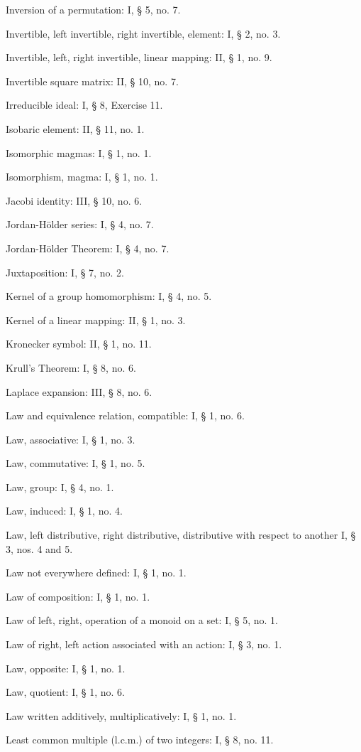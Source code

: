 Inversion of a permutation: I, § 5, no. 7.

Invertible, left invertible, right invertible, element: I, § 2, no. 3.

Invertible, left, right invertible, linear mapping: II, § 1, no. 9.

Invertible square matrix: II, § 10, no. 7.

Irreducible ideal: I, § 8, Exercise 11.

Isobaric element: II, § 11, no. 1.

Isomorphic magmas: I, § 1, no. 1.

Isomorphism, magma: I, § 1, no. 1.

Jacobi identity: III, § 10, no. 6.

Jordan-Hölder series: I, § 4, no. 7.

Jordan-Hölder Theorem: I, § 4, no. 7.

Juxtaposition: I, § 7, no. 2.

Kernel of a group homomorphism: I, § 4, no. 5.

Kernel of a linear mapping: II, § 1, no. 3.

Kronecker symbol: II, § 1, no. 11.

Krull's Theorem: I, § 8, no. 6.

Laplace expansion: III, § 8, no. 6.

Law and equivalence relation, compatible: I, § 1, no. 6.

Law, associative: I, § 1, no. 3.

Law, commutative: I, § 1, no. 5.

Law, group: I, § 4, no. 1.

Law, induced: I, § 1, no. 4.

Law, left distributive, right distributive, distributive with respect to another I, § 3, nos. 4 and 5.

Law not everywhere defined: I, § 1, no. 1.

Law of composition: I, § 1, no. 1.

Law of left, right, operation of a monoid on a set: I, § 5, no. 1.

Law of right, left action associated with an action: I, § 3, no. 1.

Law, opposite: I, § 1, no. 1.

Law, quotient: I, § 1, no. 6.

Law written additively, multiplicatively: I, § 1, no. 1.

Least common multiple (l.c.m.) of two integers: I, § 8, no. 11.

